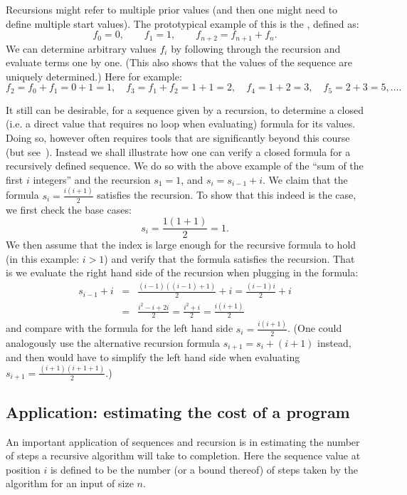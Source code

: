 Recursions might refer to multiple prior values (and then one might need to define
multiple start values). The prototypical example of this is the , defined as:
\[
f_0=0,\qquad f_1=1,\qquad f_{n+2}=f_{n+1}+f_n.
\]
We can determine arbitrary values $f_i$ by following through the recursion and evaluate
terms one by one. (This also shows that the values of the sequence are uniquely
determined.) Here for example:
\[
f_2=f_0+f_1=0+1=1,\quad
f_3=f_1+f_2=1+1=2,\quad
f_4=1+2=3,\quad
f_5=2+3=5,\ldots .
\]

\medskip

It still can be desirable, for a sequence given by a recursion, to determine a closed
(i.e. a direct value that requires no loop when evaluating)
formula for its values. Doing so, however often requires tools that are significantly
beyond this course (but see~). Instead we shall illustrate how one can verify a closed formula for
a recursively defined sequence.
We do so with the above example of the ``sum of the first $i$ integers'' and the
recursion
$s_1=1$, and $s_i=s_{i-1}+i$. We claim that the formula $s_i=\frac{i(i+1)}{2}$ satisfies
the recursion. To show that this indeed is the case, we first check the base cases:
\[
s_i=\frac{1(1+1)}{2}=1.
\]
We then assume that the index is large enough for the recursive formula to hold (in this
example: $i>1$) and verify that the formula satisfies the recursion. That is
we evaluate the right hand side of the recursion when plugging in the formula:
\begin{eqnarray*}
s_{i-1}+i&=&\frac{(i-1)((i-1)+1)}{2}+i=\frac{(i-1)i}{2}+i\\
&=&\frac{i^2-i+2i}{2}=\frac{i^2+i}{2}=\frac{i(i+1)}{2}
\end{eqnarray*}
and compare with the formula for the left hand side $s_i=\frac{i(i+1)}{2}$. (One could
analogously use the alternative recursion formula $s_{i+1}=s_i+(i+1)$ instead, and then
would have to simplify the left hand side when evaluating
$s_{i+1}=\frac{(i+1)(i+1+1)}{2}$.)

%

\subsection{Application: estimating the cost of a program}

An important application of sequences and recursion is in estimating the
number of steps a recursive algorithm will take to completion. Here the
sequence value at position $i$ is defined to be the number (or a bound
thereof) of steps taken by the algorithm for an input of size $n$. 


